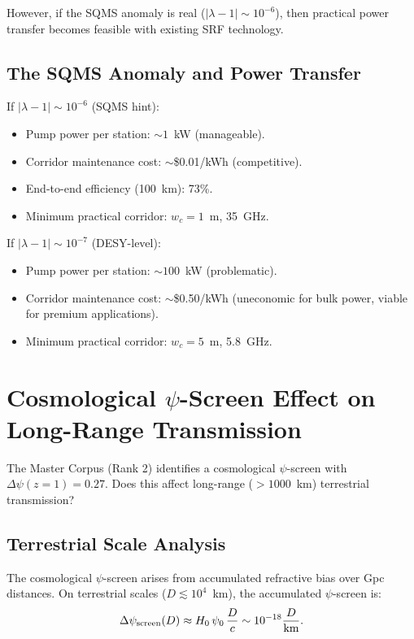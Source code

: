 \documentclass[aps,prd,twocolumn,superscriptaddress]{revtex4-2}
\begin{document}
However, if the SQMS anomaly is real ($|\lambda-1| \sim 10^{-6}$),
then practical power transfer becomes feasible with existing SRF
technology.

\subsection{The SQMS Anomaly and Power Transfer}

If $|\lambda-1| \sim 10^{-6}$ (SQMS hint):
\begin{itemize}
\item Pump power per station: $\sim 1$~kW (manageable).
\item Corridor maintenance cost: $\sim$\$0.01/kWh (competitive).
\item End-to-end efficiency (100~km): 73\%.
\item Minimum practical corridor: $w_c = 1$~m, 35~GHz.
\end{itemize}

If $|\lambda-1| \sim 10^{-7}$ (DESY-level):
\begin{itemize}
\item Pump power per station: $\sim 100$~kW (problematic).
\item Corridor maintenance cost: $\sim$\$0.50/kWh (uneconomic for
bulk power, viable for premium applications).
\item Minimum practical corridor: $w_c = 5$~m, 5.8~GHz.
\end{itemize}

\section{Cosmological $\psi$-Screen Effect on Long-Range Transmission}
\label{sec:psi-screen}

The Master Corpus (Rank 2) identifies a cosmological $\psi$-screen
with $\Delta\psi(z=1) = 0.27$.  Does this affect long-range
($> 1000$~km) terrestrial transmission?

\subsection{Terrestrial Scale Analysis}

The cosmological $\psi$-screen arises from accumulated refractive
bias over Gpc distances.  On terrestrial scales ($D \lesssim 10^4$~km),
the accumulated $\psi$-screen is:
\begin{equation}
\Delta\psi_{\rm screen}(D) \approx H_0\,\psi_0\,\frac{D}{c}
\sim 10^{-18}\frac{D}{\text{km}}.
\end{equation}
\end{document}
